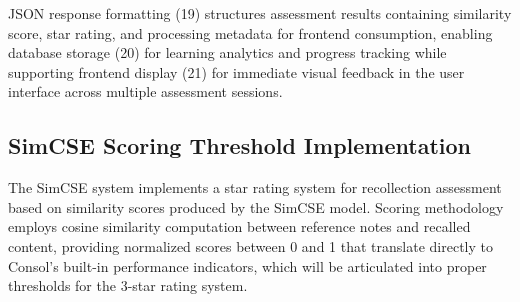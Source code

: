 {JSON response formatting (19) structures assessment results containing similarity score, star rating, and processing metadata for frontend consumption, enabling database storage (20) for learning analytics and progress tracking while supporting frontend display (21) for immediate visual feedback in the user interface across multiple assessment sessions.

% 
% 

% 

\subsection{SimCSE Scoring Threshold Implementation}

The SimCSE system implements a star rating system for recollection assessment based on similarity scores produced by the SimCSE model. Scoring methodology employs cosine similarity computation between reference notes and recalled content, providing normalized scores between 0 and 1 that translate directly to Consol's built-in performance indicators, which will be articulated into proper thresholds for the 3-star rating system.


}
